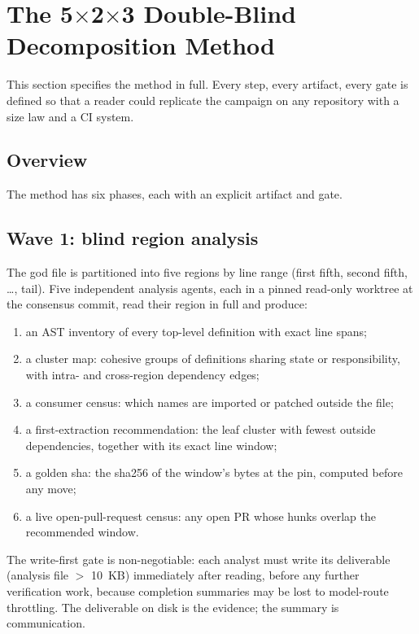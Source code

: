 \documentclass[11pt]{article}
\theoremstyle{definition}
\theoremstyle{plain}
\theoremstyle{remark}
\begin{document}
\section{The 5$\times$2$\times$3 Double-Blind Decomposition Method}
\label{sec:5x2x3}

This section specifies the method in full. Every step, every artifact, every
gate is defined so that a reader could replicate the campaign on any
repository with a size law and a CI system.

\subsection{Overview}

The method has six phases, each with an explicit artifact and gate.

\subsection{Wave 1: blind region analysis}

The god file is partitioned into five regions by line range (first fifth,
second fifth, \ldots, tail). Five independent analysis agents, each in a
pinned read-only worktree at the consensus commit, read their region in full
and produce:

\begin{enumerate}[leftmargin=*]
\item an AST inventory of every top-level definition with exact line spans;
\item a cluster map: cohesive groups of definitions sharing state or
  responsibility, with intra- and cross-region dependency edges;
\item a consumer census: which names are imported or patched outside the
  file;
\item a first-extraction recommendation: the leaf cluster with fewest
  outside dependencies, together with its exact line window;
\item a golden sha: the sha256 of the window's bytes at the pin, computed
  before any move;
\item a live open-pull-request census: any open PR whose hunks overlap the
  recommended window.
\end{enumerate}

The write-first gate is non-negotiable: each analyst must write its
deliverable (analysis file $>$ 10~KB) immediately after reading, before any
further verification work, because completion summaries may be lost to
model-route throttling. The deliverable on disk is the evidence; the summary
is communication.
\end{document}
